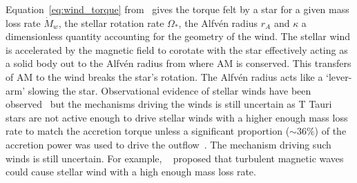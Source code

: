 \documentclass[fleqn,usenatbib]{mnras}
\begin{document}
Equation~\ref{eq:wind_torque} from~\citep{2005ApJ...632L.135M} gives the torque felt by a star for a given mass loss rate $\dot{M}_{w}$, the stellar rotation rate $\Omega_{\ast}$, the Alfv\'en radius $r_A$ and $\kappa$ a dimensionless quantity accounting for the geometry of the wind. The stellar wind is accelerated by the magnetic field to corotate with the star effectively acting as a solid body out to the Alfv\'en radius from where AM is conserved. This transfers of AM to the wind breaks the star's rotation. The Alfv\'en radius acts like a `lever-arm' slowing the star. Observational evidence of stellar winds have been observed~\citep[e.g.][]{2003ApJ...599L..41E,2006ApJ...646..319E} but the mechanisms driving the winds is still uncertain as T Tauri stars are not active enough to drive stellar winds with a higher enough mass loss rate to match the accretion torque unless a significant proportion ($\sim 36\%$) of the accretion power was used to drive the outflow~\citep{2009A&A...508.1117Z,Matt:2008ic}. The mechanism driving such winds is still uncertain. For example, ~\citet{2008ApJ...689..316C} proposed that turbulent magnetic waves could cause stellar wind with a high enough mass loss rate.
\end{document}
